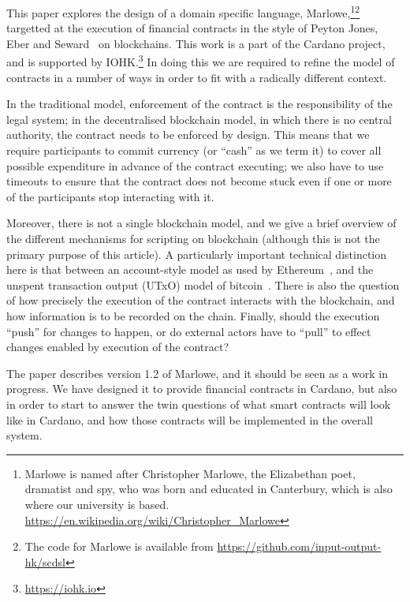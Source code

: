 \documentclass[
      acmsmall
    , screen
    , review=true
  ]{acmart}
\begin{document}
This paper explores the design of a domain specific language, Marlowe,\footnote{Marlowe is named after Christopher Marlowe, the Elizabethan poet, dramatist and spy, who was born and educated in Canterbury, which is also where our university is based. \url{https://en.wikipedia.org/wiki/Christopher_Marlowe}}\footnote{The code for Marlowe is available from \url{https://github.com/input-output-hk/scdsl}
} targetted at the execution of financial contracts in the style of Peyton Jones, Eber and Seward~\cite{PeytonJones:2000} on blockchains. This work is a part of the Cardano project, and is supported by IOHK.\footnote{\url{https://iohk.io}}
In doing this we are required to refine the model of contracts in a number of ways in order to fit with a radically different context. 

In the traditional model, enforcement of the contract is the responsibility of the legal system; in the decentralised blockchain model, in which there is no central authority, the contract needs to be enforced by design. This means that we require participants to commit currency (or ``cash'' as we term it) to cover all possible expenditure in advance of the contract executing; we also have to use timeouts to ensure that the contract does not become stuck even if one or more of the participants stop interacting with it.

Moreover, there is not a single blockchain model, and we give a brief overview of the different mechanisms for scripting on blockchain (although this is not the primary purpose of this article). 
A particularly important technical distinction here is that between an account-style model as used by Ethereum~\cite{EthereumRationale}, and the unspent transaction output (UTxO) model of bitcoin~\cite{sok}. 
There is also the question of how precisely the execution of the contract interacts with the blockchain, and how information is to be recorded on the chain. Finally, should the execution ``push'' for changes  to happen, or do external actors have to ``pull'' to effect changes enabled by execution of the contract?

The paper describes version 1.2 of Marlowe, and it should be seen as a work in progress. We have designed it to provide financial contracts in Cardano, but also in order to start to answer the twin
 questions of what smart contracts will look like in Cardano, and how those contracts will be implemented in the overall system.
\end{document}
